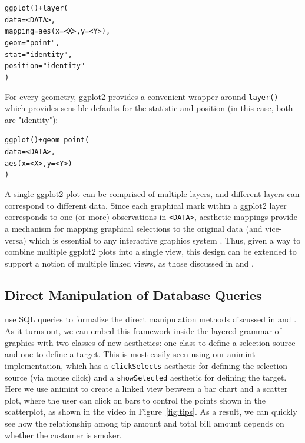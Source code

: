 \documentclass[journal]{vgtc}\usepackage[]{graphicx}\usepackage[]{color}
\makeatletter
\newcommand{\hlstr}[1]{\textcolor[rgb]{0.502,0,0}{#1}}%
\newcommand{\hlkwd}[1]{\textcolor[rgb]{0,0,0}{#1}}%
\newenvironment{kframe}{%
 \def\at@end@of@kframe{}%
 \ifinner\ifhmode%
  \def\at@end@of@kframe{\end{minipage}}%
  \begin{minipage}{\columnwidth}%
 \fi\fi%
 \def\FrameCommand##1{\hskip\@totalleftmargin \hskip-\fboxsep
 \colorbox{shadecolor}{##1}\hskip-\fboxsep
     \hskip-\linewidth \hskip-\@totalleftmargin \hskip\columnwidth}%
 \MakeFramed {\advance\hsize-\width
   \@totalleftmargin\z@ \linewidth\hsize
   \@setminipage}}%
 {\par\unskip\endMakeFramed%
 \at@end@of@kframe}
\newenvironment{knitrout}{}{} %
\makeatother
\begin{document}
\begin{knitrout}
\color{fgcolor}\begin{kframe}
\begin{alltt}
\hlkwd{ggplot}() + \hlkwd{layer}(
  data = <DATA>, 
  mapping = \hlkwd{aes}(x = <X>, y = <Y>), 
  geom = \hlstr{"point"}, 
  stat = \hlstr{"identity"},
  position = \hlstr{"identity"}
)
\end{alltt}
\end{kframe}
\end{knitrout}

For every geometry, ggplot2 provides a convenient wrapper around 
\texttt{layer()} which provides sensible defaults for the statistic and 
position (in this case, both are "identity"):

\begin{knitrout}
\color{fgcolor}\begin{kframe}
\begin{alltt}
\hlkwd{ggplot}() + \hlkwd{geom_point}(
  data = <DATA>, 
  \hlkwd{aes}(x = <X>, y = <Y>)
)
\end{alltt}
\end{kframe}
\end{knitrout}

A single ggplot2 plot can be comprised of multiple layers, and different layers 
can correspond to different data. Since each graphical mark within a ggplot2 
layer corresponds to one (or more) observations in \texttt{<DATA>}, aesthetic
mappings provide a mechanism for mapping graphical selections to the original 
data (and vice-versa) which is essential to any interactive graphics system
\citep{viewing-pipeline, plumbing}. Thus, given a way to combine multiple 
ggplot2 plots into a single view, this design can be extended to support a 
notion of multiple linked views, as those discussed in \citep{Ahlberg:1991} 
and \citep{Buja:1991vh}.

\subsection{Direct Manipulation of Database Queries}
\label{sec:extension}

\citet{ggobi:2007} use SQL queries to formalize the direct manipulation methods
discussed in \citet{Ahlberg:1991} and \citet{Buja:1991vh}. As it turns out, we 
can embed this framework inside the layered grammar of graphics with two classes
of new aesthetics: one class to define a selection source and one to define a
target. This is most easily seen using our animint implementation, which has a
\texttt{clickSelects} aesthetic for defining the selection source (via mouse 
click) and a \texttt{showSelected} aesthetic for defining the target. Here we 
use animint to create a linked view between a bar chart and a scatter plot, 
where the user can click on bars to control the points shown in the scatterplot,
as shown in the video in Figure~\ref{fig:tips}. As a result, we can quickly see
how the relationship among tip amount and total bill amount depends on whether 
the customer is smoker.
\end{document}
